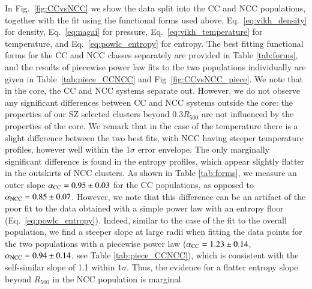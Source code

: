 \documentclass[traditabstract   ]{aa} %
\begin{document}

In Fig.~\ref{fig:CCvsNCC} we show the data split into the CC and NCC populations, together with the fit using the functional forms used above, Eq.~\eqref{eq:vikh_density} for density, Eq.~\eqref{eq:nagai} for pressure, Eq.~\eqref{eq:vikh_temperature} for temperature, and Eq.~\eqref{eq:powlc_entropy} for entropy. The best fitting functional forms for the CC and NCC classes separately are provided in Table \ref{tab:forms}, and the results of piecewise power law fits to the two populations individually are given in Table~\ref{tab:piece_CCNCC} and Fig~\ref{fig:CCvsNCC_piece}.
We note that in the core, the CC and NCC systems separate out.
However, we do not observe any significant differences between CC and NCC systems outside  the core: the properties of our SZ selected clusters beyond 0.3$R_{500}$ are not influenced by the properties of the core. We remark that in the case of the temperature there is a slight difference between the two best fits, with NCC having steeper temperature profiles, however well within the 1$\sigma$ error envelope.
The only marginally significant difference is found in the entropy profiles, which appear slightly flatter in the outskirts of NCC clusters. As shown in Table \ref{tab:forms}, we measure an outer slope $\alpha_{\rm CC}=0.95\pm0.03$ for the CC populations, as opposed to $\alpha_{\rm NCC}=0.85\pm0.07$. However, we note that this difference can be an artifact of the poor fit to the data obtained with a simple power law with an entropy floor (Eq.~\eqref{eq:powlc_entropy}). Indeed, similar to the case of the fit to the overall population, we find a steeper slope at large radii when fitting the data points for the two populations with a piecewise power law ($\alpha_{\rm CC}=1.23\pm0.14$, $\alpha_{\rm NCC}=0.94\pm0.14$, see Table \ref{tab:piece_CCNCC}), which is consistent with the self-similar slope of 1.1 within $1\sigma$. Thus, the evidence for a flatter entropy slope beyond $R_{500}$ in the NCC population is marginal.
\end{document}
